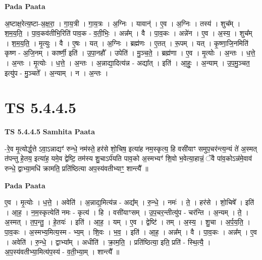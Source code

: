 \documentclass[17pt]{extarticle}
\begin{document}
\textbf{Pada Paata} \newline

अ॒ष्टाक्ष॒रेत्य॒ष्टा-अ॒क्ष॒रा॒ । गा॒य॒त्री । गा॒य॒त्रः । अ॒ग्निः । यावान्॑ । ए॒व । अ॒ग्निः । तस्य॑ । शुच᳚म् । श॒म॒य॒ति॒ । पा॒व॒कव॑तीभि॒रिति॑ पाव॒क - व॒ती॒भिः॒ । अन्न᳚म् । वै । पा॒व॒कः । अन्ने॑न । ए॒व । अ॒स्य॒ । शुच᳚म् । श॒म॒य॒ति॒ । मृ॒त्युः । वै ।   ए॒षः । यत् । अ॒ग्निः । ब्रह्म॑णः । ए॒तत् । रू॒पम् । यत् । कृ॒ष्णा॒जि॒नमिति॑ कृष्ण - अ॒जि॒नम् । कार्ष्णी॒ इति॑ । उ॒पा॒नहौ᳚ । उपेति॑ । मु॒ञ्च॒ते॒ । ब्रह्म॑णा । ए॒व । मृ॒त्योः । अ॒न्तः । ध॒त्ते॒ । अ॒न्तः । मृ॒त्योः । ध॒त्ते॒ । अ॒न्तः । अ॒न्नाद्या॒दित्य॑न्न - अद्या᳚त् । इति॑ । आ॒हुः॒ । अ॒न्याम् । उ॒प॒मु॒ञ्चत॒ इत्यु॑प - मु॒ञ्चते᳚ । अ॒न्याम् । न । अ॒न्तः ।  \newline





\section{ TS 5.4.4.5 }

\textbf{TS 5.4.4.5 } \newline
\textbf{Samhita Paata} \newline

-रे॒व मृ॒त्योर्द्ध॒त्ते ऽवा॒ऽन्नाद्यꣳ॑ रुन्धे॒ नम॑स्ते॒ हर॑से शो॒चिष॒ इत्या॑ह नम॒स्कृत्य॒ हि वसी॑याꣳ समुप॒चर॑न्त्य॒न्यं ते॑ अ॒स्मत् त॑पन्तु हे॒तय॒ इत्या॑ह॒ यमे॒व द्वेष्टि॒ तम॑स्य शु॒चाऽर्प॑यति पाव॒को अ॒स्मभ्यꣳ॑ शि॒वो भ॒वेत्या॒हान्नं॒ ॅवै पा॑व॒कोऽन्न॑मे॒वाव॑ रुन्धे॒ द्वाभ्या॒मधि॑ क्रामति॒ प्रति॑ष्ठित्या अप॒स्य॑वतीभ्याꣳ॒॒ शान्त्यै᳚ ॥ \newline

\textbf{Pada Paata} \newline

ए॒व । मृ॒त्योः । ध॒त्ते॒ । अवेति॑ । अ॒न्नाद्य॒मित्य॑न्न - अद्य᳚म् । रु॒न्धे॒ । नमः॑ । ते॒ । हर॑से । शो॒चिषे᳚ । इति॑ । आ॒ह॒ । न॒म॒स्कृत्येति॑ नमः - कृत्य॑ । हि । वसी॑याꣳसम् । उ॒प॒चर॒न्तीत्यु॑प - चर॑न्ति । अ॒न्यम् । ते॒ । अ॒स्मत् । त॒प॒न्तु॒ । हे॒तयः॑ । इति॑ । आ॒ह॒ । यम् । ए॒व । द्वेष्टि॑ । तम् । अ॒स्य॒ । शु॒चा । अ॒र्प॒य॒ति॒ । पा॒व॒कः । अ॒स्मभ्य॒मित्य॒स्म - भ्य॒म् । शि॒वः । भ॒व॒ । इति॑ । आ॒ह॒ । अन्न᳚म् । वै । पा॒व॒कः । अन्न᳚म् । ए॒व । अवेति॑ । रु॒न्धे॒ । द्वाभ्या᳚म् । अधीति॑ । क्रा॒म॒ति॒ । प्रति॑ष्ठित्या॒ इति॒ प्रति॑ - स्थि॒त्यै॒ । अ॒प॒स्य॑वतीभ्या॒मित्य॑प॒स्य॑ - व॒ती॒भ्या॒म् । शान्त्यै᳚ ॥  \newline
\end{document}
